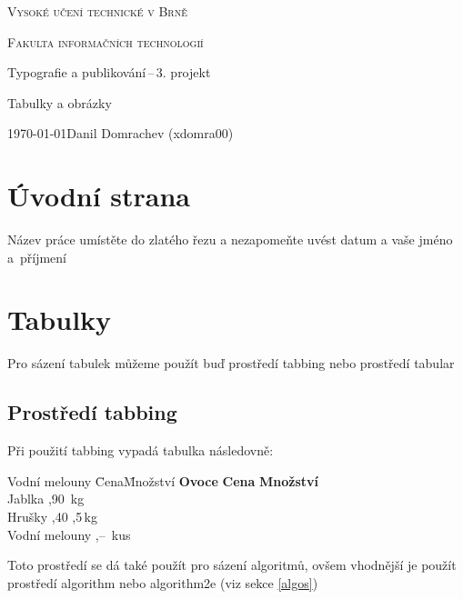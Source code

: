 \documentclass[a4paper,11pt,draft]{article}
\begin{document}
	\begin{titlepage}
		\setcounter{page}{0}
		\begin{center}	
			\addtolength{\parskip}{0.6em}
			{\Huge
				\textsc{
					Vysoké učení technické v Brně}}
			
			{\huge 
				\textsc{
					Fakulta informačních technologií}}
			
			{\LARGE
				Typografie a publikování\,--\,3. projekt
				
				\Huge Tabulky a obrázky}
			
		\end{center}
		{\Large 
			\today \hfill Danil Domrachev (xdomra00)}
	\end{titlepage}
	
	\newpage
	\section{Úvodní strana}
	
	Název práce umístěte do zlatého řezu a nezapomeňte uvést  datum a vaše jméno a~příjmení
	
	\section{Tabulky}
	
	Pro sázení tabulek můžeme použít buď prostředí {\ttfamily tabbing} nebo prostředí {\ttfamily tabular}
	
	\subsection{Prostředí \ttfamily tabbing} 
	
	Při použití {\ttfamily tabbing} vypadá tabulka následovně:
	
	\begin{tabbing}
		Vodní melouny \quad \= Cena\quad \= Množství\kill
		\textbf{Ovoce} \> \textbf{Cena} \> \textbf{Množství}\\
		Jablka ,90 \,kg\\
		Hrušky ,40 ,5\,kg\\
		Vodní melouny ,-- \,kus
	\end{tabbing}
	
	{\raggedright
	Toto prostředí se dá také použít pro sázení algoritmů, ovšem vhodnější je použít prostředí {\ttfamily algorithm} nebo {\ttfamily algorithm2e} (viz sekce \ref{algos})}
	
\end{document}
